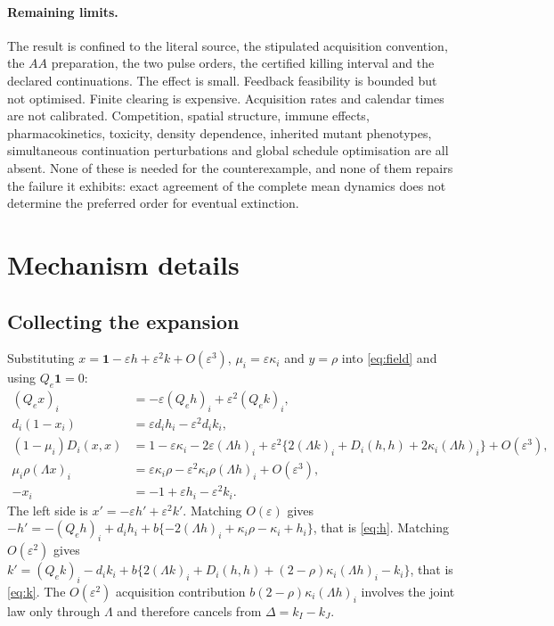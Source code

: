 \documentclass[11pt]{article}
\theoremstyle{remark}
\newcommand{\one}{\mathbf 1}
\newcommand{\eps}{\varepsilon}
\begin{document}
\paragraph{Remaining limits.} The result is confined to the literal source, the
stipulated acquisition convention, the $AA$ preparation, the two pulse orders,
the certified killing interval and the declared continuations. The effect is
small. Feedback feasibility is bounded but not optimised. Finite clearing is
expensive. Acquisition rates and calendar times are not calibrated. Competition,
spatial structure, immune effects, pharmacokinetics, toxicity, density
dependence, inherited mutant phenotypes, simultaneous continuation perturbations
and global schedule optimisation are all absent. None of these is needed for the
counterexample, and none of them repairs the failure it exhibits: exact agreement
of the complete mean dynamics does not determine the preferred order for eventual
extinction.

\appendix

\section{Mechanism details}\label{sec:mechdetail}

\subsection{Collecting the expansion}
Substituting $x=\one-\eps h+\eps^2k+O(\eps^3)$, $\mu_i=\eps\kappa_i$ and $y=\rho$
into \eqref{eq:field} and using $Q_e\one=0$:
\begin{align*}
 (Q_ex)_i&=-\eps(Q_eh)_i+\eps^2(Q_ek)_i,\\
 d_i(1-x_i)&=\eps d_ih_i-\eps^2d_ik_i,\\
 (1-\mu_i)D_i(x,x)&=1-\eps\kappa_i-2\eps(\Lambda h)_i
   +\eps^2\bigl\{2(\Lambda k)_i+D_i(h,h)+2\kappa_i(\Lambda h)_i\bigr\}+O(\eps^3),\\
 \mu_i\rho(\Lambda x)_i&=\eps\kappa_i\rho-\eps^2\kappa_i\rho(\Lambda h)_i+O(\eps^3),\\
 -x_i&=-1+\eps h_i-\eps^2k_i.
\end{align*}
The left side is $x'=-\eps h'+\eps^2k'$. Matching $O(\eps)$ gives
$-h'=-(Q_eh)_i+d_ih_i+b\{-2(\Lambda h)_i+\kappa_i\rho-\kappa_i+h_i\}$, that is
\eqref{eq:h}. Matching $O(\eps^2)$ gives
$k'=(Q_ek)_i-d_ik_i+b\{2(\Lambda k)_i+D_i(h,h)+(2-\rho)\kappa_i(\Lambda h)_i-k_i\}$,
that is \eqref{eq:k}. The $O(\eps^2)$ acquisition contribution
$b(2-\rho)\kappa_i(\Lambda h)_i$ involves the joint law only through $\Lambda$ and
therefore cancels from $\Delta=k_I-k_J$.
\end{document}
